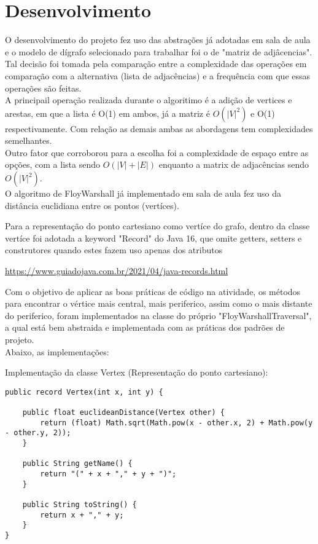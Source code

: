 \documentclass[a4paper, 12pt]{article}
\begin{document}
\newpage
\section{Desenvolvimento}

O desenvolvimento do projeto fez uso das abstrações já adotadas em sala de aula e o modelo de dígrafo selecionado para trabalhar foi o de "matriz de adjâcencias".\\

Tal decisão foi tomada pela comparação entre a complexidade das operações em comparação com a alternativa (lista de adjacências) e a frequência com que essas operações são feitas.\\
A principail operação realizada durante o algoritimo é a adição de vertices e arestas, em que a lista é O(1) em ambos, já a matriz é $O(|V|^2)$ e O(1) respectivamente. Com relação as demais ambas as abordagens tem complexidades semelhantes.\\
Outro fator que corroborou para a escolha foi a complexidade de espaço entre as opções, com a lista sendo $O(|V|+|E|)$ enquanto a matrix de adjacências sendo $O(|V|^2)$.\\

O algoritmo de FloyWarshall já implementado em sala de aula fez uso da distância euclidiana entre os pontos (vertíces).

Para a representação do ponto cartesiano como vertíce do grafo, dentro da classe vertíce foi adotada a keyword "Record" do Java 16, que omite getters, setters e construtores quando estes fazem uso apenas dos atributos

\url{https://www.guiadojava.com.br/2021/04/java-records.html}

Com o objetivo de aplicar as boas práticas de código na atividade, os métodos para encontrar o vértice mais central, mais periferico, assim como o mais distante do periferico, foram implementados na classe do próprio "FloyWarshallTraversal", a qual está bem abstraida e implementada com as práticas dos padrões de projeto.\\

Abaixo, as implementações:

Implementação da classe Vertex (Representação do ponto cartesiano):

\begin{verbatim}
public record Vertex(int x, int y) {

    public float euclideanDistance(Vertex other) {
        return (float) Math.sqrt(Math.pow(x - other.x, 2) + Math.pow(y - other.y, 2));
    }

    public String getName() {
        return "(" + x + "," + y + ")";
    }

    public String toString() {
        return x + "," + y;
    }
}

\end{verbatim}
\end{document}
